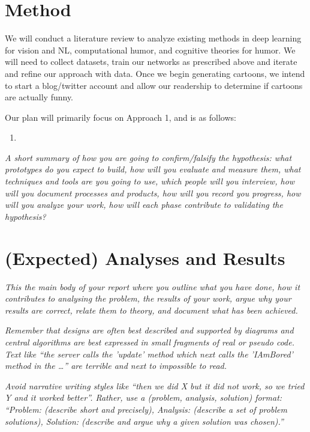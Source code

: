 \documentclass[letter]{article}
\begin{document}
\section{Method}

We will conduct a literature review to analyze existing methods in deep learning for vision and NL, computational humor, and cognitive theories for humor. We will need to collect datasets, train our networks as prescribed above and iterate and refine our approach with data. Once we begin generating cartoons, we intend to start a blog/twitter account and allow our readership to determine if cartoons are actually funny. 

Our plan will primarily focus on Approach 1, and is as follows:
\begin{enumerate}
	\item 
\end{enumerate}


\textit{A short summary of how you are going to confirm/falsify the
hypothesis: what prototypes do you expect to build, how will you
evaluate and measure them, what techniques and tools are you going to
use, which people will you interview, how will you document processes
and products, how will you record you progress, how will you analyze
your work, how will each phase contribute to validating the
hypothesis?}

\section{(Expected) Analyses and Results}

\textit{This the main body of your report where you outline what you have
done, how it contributes to analysing the problem, the results of your
work, argue why your results are correct, relate them to theory, and
document what has been achieved.}

\textit{Remember that designs are often best described and supported by
diagrams and central algorithms are best expressed in small fragments
of real or pseudo code. Text like ``the server calls the 'update'
method which next calls the 'IAmBored' method in the \ldots'' are
terrible and next to impossible to read.}

\textit{Avoid narrative writing styles like ``then we did X but it did not work, so
we tried Y and it worked better''. Rather, use a (problem, analysis,
solution) format: ``Problem: (describe short and precisely), Analysis:
(describe a set of problem solutions), Solution: (describe and argue
why a given solution was chosen).''}
\end{document}
